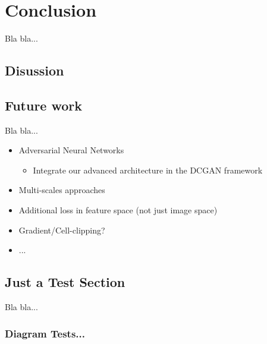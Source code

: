 
\chapter{Conclusion} \label{chapter:conclusion}

Bla bla...


\section{Disussion}




\section{Future work}



Bla bla...

\begin{itemize}
\item Adversarial Neural Networks
	\begin{itemize}
	\item Integrate our advanced architecture in the DCGAN framework
	\end{itemize}
\item Multi-scales approaches
\item Additional loss in feature space (not just image space)
\item Gradient/Cell-clipping?
\item ...
\end{itemize}

\section{Just a Test Section}

Bla bla...


\subsection{Diagram Tests...}


